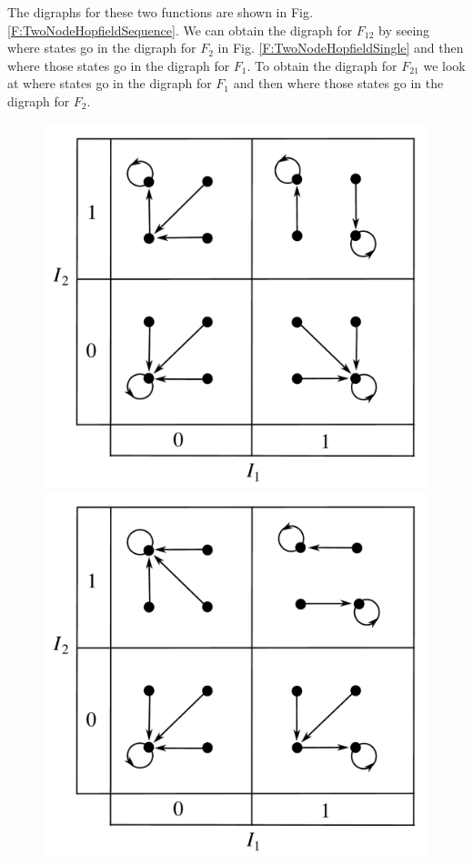 The digraphs for these two functions are shown in Fig.  
\ref{F:TwoNodeHopfieldSequence}.  We can obtain the digraph for $F_{12}$ by
seeing where states go in the digraph for $F_2$ in Fig. 
\ref{F:TwoNodeHopfieldSingle} and then where those states go in the digraph for
$F_1$.  To obtain the digraph for $F_{21}$ we look at where states go in the
digraph for $F_1$ and then where those states go in the digraph for $F_2$.

\begin{figure}[ht]
\centering
\includegraphics[scale=0.342]{./images/TwoNodeHopfieldUpdate12.pdf}
\includegraphics[scale=0.342]{./images/TwoNodeHopfieldUpdate21.pdf}

\end{figure}
